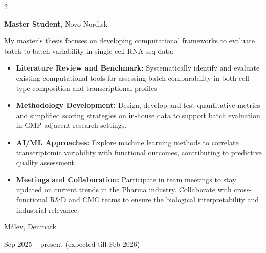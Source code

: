 \documentclass[10pt, letterpaper]{article}
\newenvironment{highlights}{
    \begin{itemize}[
        topsep=0.10 cm,
        parsep=0.10 cm,
        partopsep=0pt,
        itemsep=0pt,
        leftmargin=0.4 cm + 10pt
    ]
}{
    \end{itemize}
} %
\newenvironment{twocolentry}[2][]{
    \onecolentry
    \def\secondColumn{#2}
    \setcolumnwidth{\fill, 4.5 cm}
    \begin{paracol}{2}
}{
    \switchcolumn \raggedleft \secondColumn
    \end{paracol}
    \endonecolentry
} %
\begin{document}
        \begin{twocolentry}{
    Målev, Denmark

    Sep 2025 – present (expected till Feb 2026)
}
    \textbf{Master Student}, Novo Nordisk

    \vspace{0.1cm}
    
     My master’s thesis focuses on developing computational frameworks to evaluate batch-to-batch variability in single-cell RNA-seq data:

    \begin{highlights}
        \item \textbf{Literature Review and Benchmark:} Systematically identify and evaluate existing computational tools for assessing batch comparability in both cell-type composition and transcriptional profiles

        \vspace{0.1cm}

        \item \textbf{Methodology Development:} Design, develop and test quantitative metrics and simplified scoring strategies on in-house data to support batch evaluation in GMP-adjacent research settings.

        \vspace{0.1cm}

        \item \textbf{AI/ML Approaches:} Explore machine learning methods to correlate transcriptomic variability with functional outcomes, contributing to predictive quality assessment.

        \vspace{0.1cm}

        \item \textbf{Meetings and Collaboration:} Participate in team meetings to stay updated on current trends in the Pharma industry. Collaborate with cross-functional R\&D and CMC teams to ensure the biological interpretability and industrial relevance.
    \end{highlights}
\end{twocolentry}


        \vspace{0.3 cm}
\end{document}
